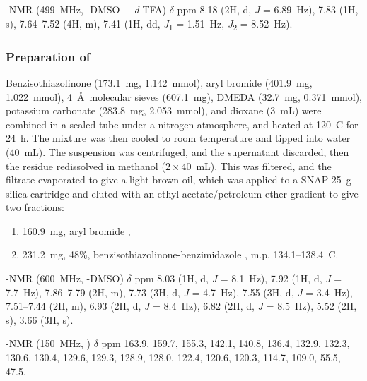 \begin{refsection}
-NMR (499~MHz, -DMSO + \textit{d}-TFA) $\delta$ ppm 8.18 (2H, d, \textit{J} = 6.89~Hz), 7.83 (1H, s), 7.64--7.52 (4H, m), 7.41 (1H, dd, \textit{J}\textsubscript{1} = 1.51~Hz, \textit{J}\textsubscript{2} = 8.52~Hz).

\subsubsection{Preparation of }
Benzisothiazolinone  (173.1~mg, 1.142~mmol), aryl bromide  (401.9~mg, 1.022~mmol), 4~\AA\ molecular sieves (607.1~mg), DMEDA (32.7~mg, 0.371~mmol), potassium carbonate (283.8~mg, 2.053~mmol), and dioxane (3~mL) were combined in a sealed tube under a nitrogen atmosphere, and heated at 120~\degree{}C for 24~h.
The mixture was then cooled to room temperature and tipped into water (40~mL).
The suspension was centrifuged, and the supernatant discarded, then the residue redissolved in methanol ($2\times40$~mL).
This was filtered, and the filtrate evaporated to give a light brown oil, which was applied to a SNAP 25~g silica cartridge and eluted with an ethyl acetate/petroleum ether gradient to give two fractions:
\begin{enumerate}
    \item 160.9~mg, aryl bromide ,
    \item 231.2~mg, 48\%, benzisothiazolinone-benzimidazole , m.p. 134.1--138.4~\degree{}C.
\end{enumerate}


-NMR (600~MHz, -DMSO) $\delta$ ppm 8.03 (1H, d, \textit{J} = 8.1~Hz), 7.92 (1H, d, \textit{J} = 7.7~Hz), 7.86--7.79 (2H, m), 7.73 (3H, d, \textit{J} = 4.7~Hz), 7.55 (3H, d, \textit{J} = 3.4~Hz), 7.51--7.44 (2H, m), 6.93 (2H, d, \textit{J} = 8.4~Hz), 6.82 (2H, d, \textit{J} = 8.5~Hz), 5.52 (2H, s), 3.66 (3H, s).

-NMR (150~MHz, ) $\delta$ ppm 163.9, 159.7, 155.3, 142.1, 140.8, 136.4, 132.9, 132.3, 130.6, 130.4, 129.6, 129.3, 128.9, 128.0, 122.4, 120.6, 120.3, 114.7, 109.0, 55.5, 47.5.


\end{refsection}

